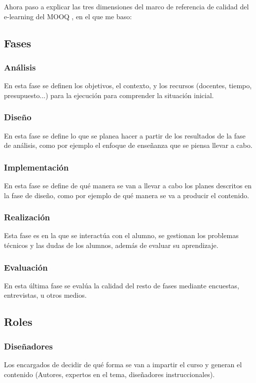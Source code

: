 Ahora paso a explicar las tres dimensiones del marco de referencia de calidad del e-learning del MOOQ \cite{stracke2018quality}, en el que me baso:
\subsection{Fases}

\subsubsection{Análisis}
En esta fase se definen los objetivos, el contexto, y los recursos (docentes, tiempo, presupuesto...) para la ejecución para comprender la situación inicial.

\subsubsection{Diseño}
En esta fase se define lo que se planea hacer a partir de los resultados de la fase de análisis, como por ejemplo el enfoque de enseñanza que se piensa llevar a cabo.

\subsubsection{Implementación}
En esta fase se define de qué manera se van a llevar a cabo los planes descritos en la fase de diseño, como por ejemplo de qué manera se va a producir el contenido.

\subsubsection{Realización}
Esta fase es en la que se interactúa con el alumno, se gestionan los problemas técnicos y las dudas de los alumnos, además de evaluar su aprendizaje.

\subsubsection{Evaluación}
En esta última fase se evalúa la calidad del resto de fases mediante encuestas, entrevistas, u otros medios.

\subsection{Roles}

\subsubsection{Diseñadores}
Los encargados de decidir de qué forma se van a impartir el curso y generan el contenido (Autores, expertos en el tema, diseñadores instruccionales). 

